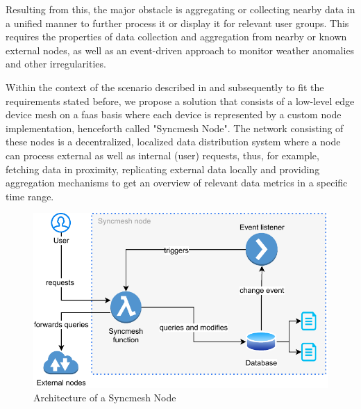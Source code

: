 \documentclass[conference]{IEEEtran}
\begin{document}
\begin{table}[!h]
\caption{Excerpt of the Dataset}
\label{tbl:csvHeaders}
\centering
{}
\end{table}

Resulting from this, the major obstacle is aggregating or collecting nearby data in a unified manner to further process it or display it for relevant user groups. This requires the properties of data collection and aggregation from nearby or known external nodes, as well as an event-driven approach to monitor weather anomalies and other irregularities.

Within the context of the scenario described in  and subsequently to fit the requirements stated before, we propose a solution that consists of a low-level edge device mesh on a \ac{faas} basis where each device is represented by a custom node implementation, henceforth called "Syncmesh Node". The network consisting of these nodes is a decentralized, localized data distribution system where a node can process external as well as internal (user) requests, thus, for example, fetching data in proximity, replicating external data locally and providing aggregation mechanisms to get an overview of relevant data metrics in a specific time range.

\begin{figure}[!h]
	\centering
		\includegraphics[width=\linewidth]{img/syncmesh_node.pdf}
	\caption{Architecture of a Syncmesh Node}
    \label{fig:syncmesh-node} %
\end{figure}
\end{document}
